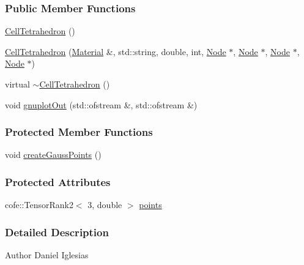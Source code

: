 \subsubsection*{Public Member Functions}
\begin{DoxyCompactItemize}
\item 
\hyperlink{classmknix_1_1_cell_tetrahedron_a6824b4f7304f0717ccdbaf32126239a0}{Cell\-Tetrahedron} ()
\item 
\hyperlink{classmknix_1_1_cell_tetrahedron_aa462fd7b0dffd4896100e413e60b55d1}{Cell\-Tetrahedron} (\hyperlink{classmknix_1_1_material}{Material} \&, std\-::string, double, int, \hyperlink{classmknix_1_1_node}{Node} $\ast$, \hyperlink{classmknix_1_1_node}{Node} $\ast$, \hyperlink{classmknix_1_1_node}{Node} $\ast$, \hyperlink{classmknix_1_1_node}{Node} $\ast$)
\item 
virtual \hyperlink{classmknix_1_1_cell_tetrahedron_a4ae5db633022a1714da463f4c32ffa03}{$\sim$\-Cell\-Tetrahedron} ()
\item 
void \hyperlink{classmknix_1_1_cell_tetrahedron_aba4f93f294a8ceea377cc2feb44f56db}{gnuplot\-Out} (std\-::ofstream \&, std\-::ofstream \&)
\end{DoxyCompactItemize}
\subsubsection*{Protected Member Functions}
\begin{DoxyCompactItemize}
\item 
void \hyperlink{classmknix_1_1_cell_tetrahedron_a933dde9cb028e9be1f0f9024fb7b898d}{create\-Gauss\-Points} ()
\end{DoxyCompactItemize}
\subsubsection*{Protected Attributes}
\begin{DoxyCompactItemize}
\item 
cofe\-::\-Tensor\-Rank2$<$ 3, double $>$ \hyperlink{classmknix_1_1_cell_tetrahedron_af1f5f57c6cd10b8a416617b4761dfac6}{points}
\end{DoxyCompactItemize}


\subsubsection{Detailed Description}
\begin{DoxyAuthor}{Author}
Daniel Iglesias 
\end{DoxyAuthor}


